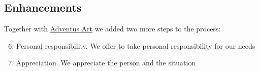\subsection{Enhancements}

Together with \href{https://www.adventusart.de/}{Adventus Art} we added two more steps to the process:

\begin{enumerate}
    \setcounter{enumi}{5}
    \item Personal responsibility. We offer to take personal responsibility for our needs
    \item Appreciation. We appreciate the person and the situation
\end{enumerate}
